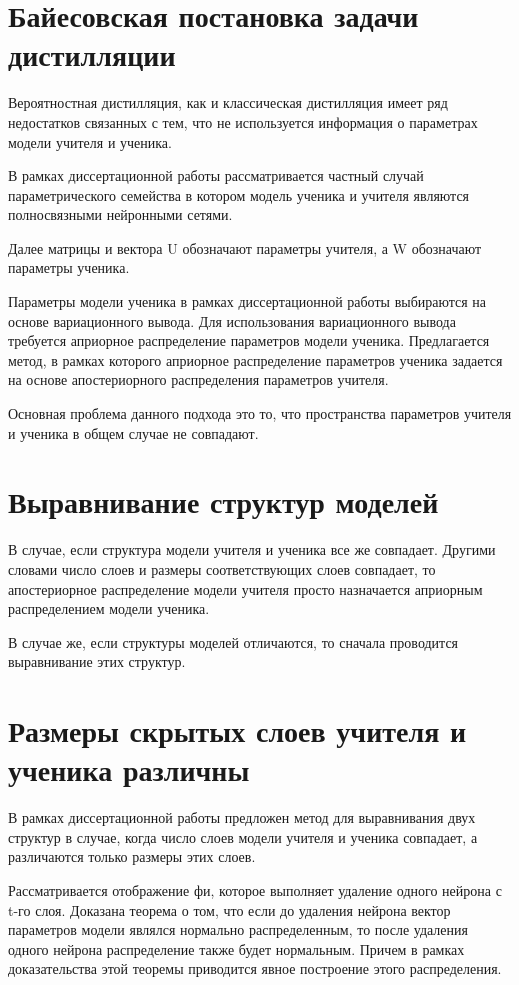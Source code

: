 \documentclass[10pt, twoside]{article}
\begin{document}
\section{Байесовская постановка задачи дистилляции}
Вероятностная дистилляция, как и классическая дистилляция имеет ряд недостатков связанных с тем, что не используется информация о параметрах модели учителя и ученика.

В рамках диссертационной работы рассматривается частный случай параметрического семейства в котором модель ученика и учителя являются полносвязными нейронными сетями.

Далее матрицы и вектора U обозначают параметры учителя, а W обозначают параметры ученика.

Параметры модели ученика в рамках диссертационной работы выбираются на основе вариационного вывода. Для использования вариационного вывода требуется априорное распределение параметров модели ученика. Предлагается метод, в рамках которого априорное распределение параметров ученика задается  на основе апостериорного распределения параметров учителя.

Основная проблема данного подхода это то, что пространства параметров учителя и ученика в общем случае не совпадают.

\section{Выравнивание структур моделей}
В случае, если структура модели учителя и ученика все же совпадает. Другими словами число слоев и размеры соответствующих слоев совпадает, то апостериорное распределение модели учителя просто назначается априорным распределением модели ученика.

В случае же, если структуры моделей отличаются, то сначала проводится выравнивание этих структур.

\section{Размеры скрытых слоев учителя и ученика различны}
В рамках диссертационной работы предложен метод для выравнивания двух структур в случае, когда число слоев модели учителя и ученика совпадает, а различаются только размеры этих слоев.

Рассматривается отображение фи, которое выполняет удаление одного нейрона с t-го слоя.
Доказана теорема о том, что если до удаления нейрона вектор параметров модели являлся нормально распределенным, то после удаления одного нейрона распределение также будет нормальным. Причем в рамках доказательства этой теоремы приводится явное построение этого распределения.
\end{document}
